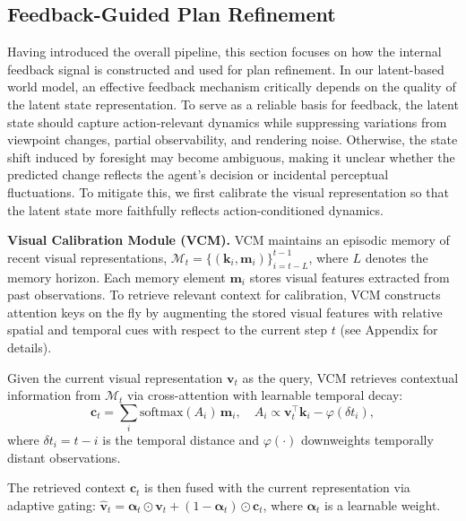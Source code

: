 \documentclass{article}
\theoremstyle{plain}
\theoremstyle{definition}
\theoremstyle{remark}
\begin{document}
\subsection{Feedback-Guided Plan Refinement}
\label{sec:plan_refinement}
Having introduced the overall pipeline, this section focuses on how the internal feedback signal is constructed and used for plan refinement.
In our latent-based world model, an effective feedback mechanism critically depends on the quality of the latent state representation.
To serve as a reliable basis for feedback, the latent state should capture action-relevant dynamics while suppressing variations from viewpoint changes, partial observability, and rendering noise.
Otherwise, the state shift induced by foresight may become ambiguous, making it unclear whether the predicted change reflects the agent’s decision or incidental perceptual fluctuations.
To mitigate this, we first calibrate the visual representation so that the latent state more faithfully reflects action-conditioned dynamics.

\noindent\textbf{Visual Calibration Module (VCM).}
VCM maintains an episodic memory of recent visual representations, $\mathcal{M}_t = \lbrace (\boldsymbol{k}_i,\boldsymbol{m}_i) \rbrace_{i=t-L}^{t-1}$,
where $L$ denotes the memory horizon.
Each memory element $\boldsymbol{m}_i$ stores visual features extracted from past observations.
To retrieve relevant context for calibration, VCM constructs attention keys on the fly by augmenting the stored visual features with relative spatial and temporal cues with respect to the current step $t$ (see Appendix for details).

Given the current visual representation $\boldsymbol{v}_t$ as the query, VCM retrieves contextual information from $\mathcal{M}_t$ via cross-attention with learnable temporal decay:
\begin{equation}
\boldsymbol{c}_t = \sum_i \mathrm{softmax}(A_i)\,\boldsymbol{m}_i,\quad
A_i \propto \boldsymbol{v}_t^\top \boldsymbol{k}_i - \varphi(\delta t_i),
\end{equation}
where $\delta t_i = t - i$ is the temporal distance and $\varphi(\cdot)$ downweights temporally distant observations.

The retrieved context $\boldsymbol{c}_t$ is then fused with the current representation via adaptive gating:
$\hat{\boldsymbol{v}}_t = \boldsymbol{\alpha}_t \odot \boldsymbol{v}_t + (1-\boldsymbol{\alpha}_t) \odot \boldsymbol{c}_t$,
where $\boldsymbol{\alpha}_t$ is a learnable weight.
\end{document}
